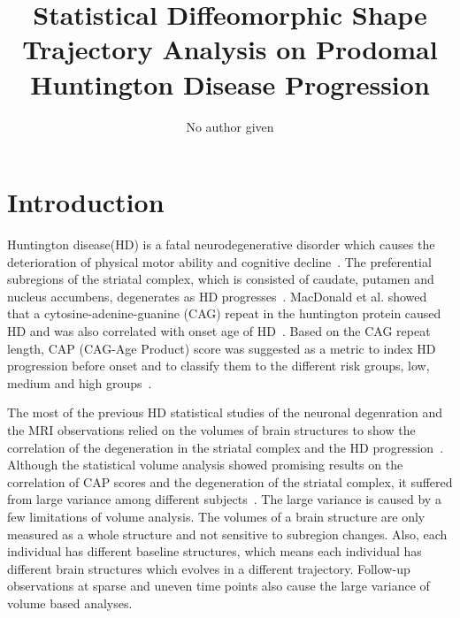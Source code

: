 \documentclass[10pt]{article}
\begin{document}
\title{Statistical Diffeomorphic Shape Trajectory Analysis on Prodomal Huntington Disease Progression}
\author{No author given}
\date{}
\maketitle

\section*{Introduction}

% 

Huntington disease(HD) is a fatal neurodegenerative disorder which causes the deterioration of physical motor ability and cognitive decline~\cite{Paulson2011, Imarisio2008}. 
The preferential subregions of the striatal complex, which is consisted of caudate, putamen and nucleus accumbens, degenerates as HD progresses~\cite{Ferrante1987a, Vonsattel1985}. 
MacDonald et al. showed that a cytosine-adenine-guanine (CAG) repeat in the huntington protein caused HD and was also correlated with onset age of HD~\cite{MacDonald93}. 
Based on the CAG repeat length, CAP (CAG-Age Product) score was suggested as a metric to index HD progression before onset and to classify them to the different risk groups, low, medium and high groups~\cite{Langbehn2010, Zhang2011}. 

The most of the previous HD statistical studies of the neuronal degenration and the MRI observations 
relied on the volumes of brain structures to show the correlation of the degeneration in 
the striatal complex and the HD progression~\cite{Paulsen2014, Younes2014, Paulsen2014C}. 
Although the statistical volume analysis showed promising results on the correlation of CAP scores and the degeneration of the striatal complex, 
it suffered from large variance among different subjects~\cite{Paulsen2014C}. The large variance is caused by a few limitations of volume analysis.
The volumes of a brain structure are only measured as a whole structure and not sensitive to subregion changes. 
Also, each individual has different baseline structures, which means each individual has different brain structures which evolves in a different trajectory. 
Follow-up observations at sparse and uneven time points also cause the large variance of volume based analyses.
\end{document}
